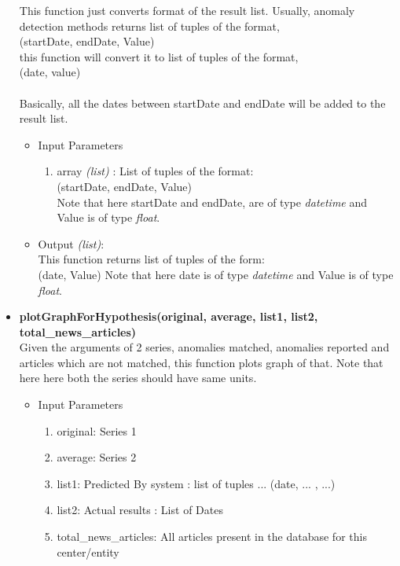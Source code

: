 \begin{itemize}
 
 This function just converts format of the result list. Usually, anomaly 
detection methods returns list of tuples of the format, \\ 
 (startDate, endDate, Value) \\
 this function will convert it to list of tuples of the format, \\
 (date, value) \\
 \\
 Basically, all the dates between startDate and endDate will be added to the 
result list.
 
 \begin{itemize}
 \item Input Parameters
 
 \begin{enumerate}
  \item array \textit{(list)} : List of tuples of the format: \\
  (startDate, endDate, Value) \\
  Note that here startDate and endDate, are of type \textit{datetime} and Value 
is of type \textit{float}.
 \end{enumerate}

 \item Output \textit{(list)}: \\
 This function returns list of tuples of the form: \\
 (date, Value)
  Note that here date is of type \textit{datetime} and Value is of type 
\textit{float}.
 \end{itemize}
 
 
 
 \item \textbf{plotGraphForHypothesis(original, average, list1, list2, total\_news\_articles)} \\
  
 Given the arguments of 2 series, anomalies matched, anomalies reported and articles which are not matched, this function plots graph of that. Note that here here both the series should have same units.
 
 \begin{itemize}
 \item Input Parameters
 
 \begin{enumerate}
  \item original: Series 1
  \item average: Series 2
  \item list1: Predicted By system : list of tuples ... (date, ... , ...)
  \item list2: Actual results : List of Dates
  \item total\_news\_articles: All articles present in the database for this center/entity
 \end{enumerate}


\end{itemize}
\end{itemize}
